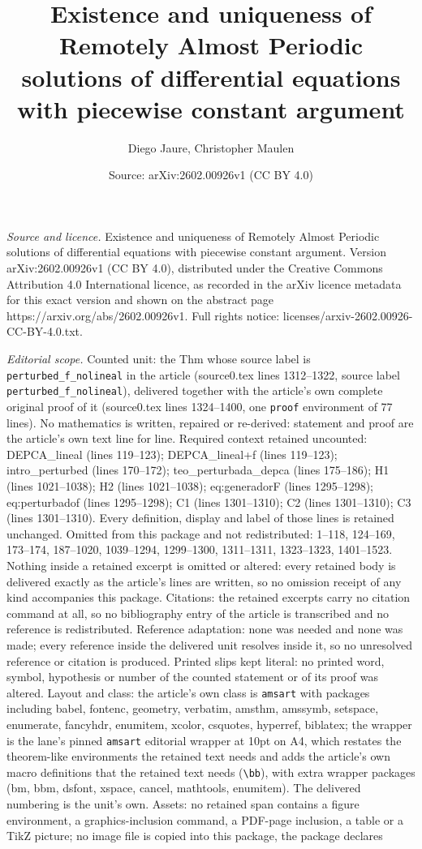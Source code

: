 \documentclass[10pt,a4paper]{amsart}
\title[Existence and uniqueness of Remotely Almost Periodic solutio]{Existence and uniqueness of Remotely Almost Periodic solutions of differential equations with piecewise constant argument}
\author{Diego Jaure, Christopher Maulen}
\date{Source: arXiv:2602.00926v1 (CC BY 4.0)}
\begin{document}
\maketitle

\noindent\emph{Source and licence.} Existence and uniqueness of Remotely Almost Periodic solutions of differential equations with piecewise constant argument. Version arXiv:2602.00926v1 (CC BY 4.0), distributed under the Creative Commons Attribution 4.0 International licence, as recorded in the arXiv licence metadata for this exact version and shown on the abstract page https://arxiv.org/abs/2602.00926v1. Full rights notice: licenses/arxiv-2602.00926-CC-BY-4.0.txt.\par\smallskip

\noindent\textit{Editorial scope.} Counted unit: the Thm whose source label is \texttt{perturbed\_f\_nolineal} in the article (source0.tex lines 1312--1322, source label \texttt{perturbed\_f\_nolineal}), delivered together with the article's own complete original proof of it (source0.tex lines 1324--1400, one \texttt{proof} environment of 77 lines). No mathematics is written, repaired or re-derived: statement and proof are the article's own text line for line. Required context retained uncounted: DEPCA\_lineal (lines 119--123); DEPCA\_lineal+f (lines 119--123); intro\_perturbed (lines 170--172); teo\_perturbada\_depca (lines 175--186); H1 (lines 1021--1038); H2 (lines 1021--1038); eq:generadorF (lines 1295--1298); eq:perturbadof (lines 1295--1298); C1 (lines 1301--1310); C2 (lines 1301--1310); C3 (lines 1301--1310). Every definition, display and label of those lines is retained unchanged. Omitted from this package and not redistributed: 1--118, 124--169, 173--174, 187--1020, 1039--1294, 1299--1300, 1311--1311, 1323--1323, 1401--1523. Nothing inside a retained excerpt is omitted or altered: every retained body is delivered exactly as the article's lines are written, so no omission receipt of any kind accompanies this package. Citations: the retained excerpts carry no citation command at all, so no bibliography entry of the article is transcribed and no reference is redistributed. Reference adaptation: none was needed and none was made; every reference inside the delivered unit resolves inside it, so no unresolved reference or citation is produced. Printed slips kept literal: no printed word, symbol, hypothesis or number of the counted statement or of its proof was altered. Layout and class: the article's own class is \texttt{amsart} with packages including babel, fontenc, geometry, verbatim, amsthm, amssymb, setspace, enumerate, fancyhdr, enumitem, xcolor, csquotes, hyperref, biblatex; the wrapper is the lane's pinned \texttt{amsart} editorial wrapper at 10pt on A4, which restates the theorem-like environments the retained text needs and adds the article's own macro definitions that the retained text needs (\texttt{\textbackslash bb}), with extra wrapper packages (bm, bbm, dsfont, xspace, cancel, mathtools, enumitem). The delivered numbering is the unit's own. Assets: no retained span contains a figure environment, a graphics-inclusion command, a PDF-page inclusion, a table or a TikZ picture; no image file is copied into this package, the package declares 
\end{document}
